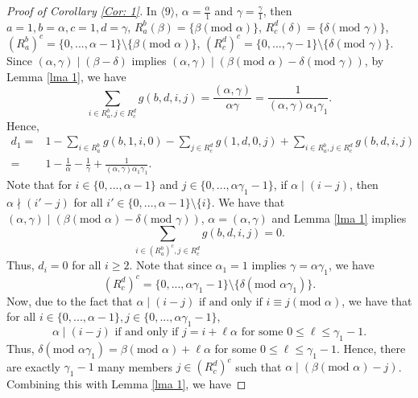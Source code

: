 \documentclass{amsart}
\theoremstyle{definition}
\numberwithin{equation}{section}%
\begin{document}
\begin{proof}[Proof of Corollary \ref{Cor: 1}]
    In $\langle 9 \rangle$, $\alpha=\frac{\alpha}{1}$ and $\gamma=\frac{\gamma}{1}$, then $a=1, b=\alpha, c=1, d=\gamma$, $R_a^b(\beta)=\{ \beta (\mbox{mod } \alpha) \}$, $R_c^d(\delta)=\{ \delta (\mbox{mod } \gamma) \}$, $(R_a^b)^c=\{0, ..., \alpha-1\}\setminus\{ \beta (\mbox{mod } \alpha) \}$, $(R_c^d)^c=\{0, ..., \gamma-1\}\setminus\{ \delta (\mbox{mod } \gamma) \}$. Since $(\alpha,\gamma)\mid (\beta-\delta)$ implies $(\alpha,\gamma)\mid (\beta(\mbox{mod }\alpha)- \delta(\mbox{mod }\gamma))$, by Lemma \ref{lma 1}, we have 
    \begin{equation*}
        \sum_{i\in R_a^b, j\in R_c^d}g(b,d,i,j)=\frac{(\alpha,\gamma)}{\alpha \gamma}=\frac{1}{(\alpha
,\gamma )\alpha _{1}\gamma _{1}}.
    \end{equation*}
    Hence, 
    \begin{align*}
             d_1=&1-\sum_{i\in R_a^b} g(b,1,i,0)-\sum_{j\in R_c^d} g(1,d,0,j)+\sum_{i\in R_a^b, j\in R_c^d}g(b,d,i,j)\\
        =& 1-\frac{1}{\alpha}-\frac{1}{\gamma}+\frac{1}{(\alpha
,\gamma )\alpha _{1}\gamma _{1}}.
    \end{align*}
Note that for $i\in \{0, ..., \alpha-1\}$ and $j\in \{0, ..., \alpha \gamma_1-1\}$, if $\alpha \mid (i-j)$, then $\alpha \nmid (i'-j)$ for all $i'\in \{0, ..., \alpha -1\}\setminus \{i\}$. We have that $(\alpha,\gamma)\mid (\beta(\mbox{mod }\alpha)- \delta(\mbox{mod }\gamma))$, $\alpha=(\alpha,\gamma)$ and Lemma \ref{lma 1} implies 
\begin{equation*}\label{pf 9-2}
    \sum_{i\in (R_a^b)^c, j\in R_c^d}g(b,d,i,j)=0.
\end{equation*}
Thus, $d_i=0$ for all $i\geq 2$. Note that since $\alpha_1=1$ implies $\gamma= \alpha \gamma_1$, we have
    \begin{equation*}
        (R_c^d)^c=\{0, ..., \alpha\gamma_1-1\}\setminus\{ \delta (\mbox{mod } \alpha\gamma_1) \}.
    \end{equation*}
Now, due to the fact that $\alpha\mid (i-j) \mbox{ if and only if } i\equiv j (\mbox{mod }\alpha)$, we have that for all $i \in \{0, ..., \alpha-1\}, j\in \{0, ..., \alpha \gamma_1-1\}$,
\begin{equation*}
    \alpha\mid (i-j) \mbox{ if and only if } j=i+\ell \alpha \mbox{ for some }0\leq \ell \leq \gamma_1-1.
\end{equation*}
Thus, $\delta (\mbox{mod } \alpha\gamma_1)=\beta(\mbox{mod }\alpha)+\ell \alpha $ for some $0\leq \ell \leq \gamma_1-1$. Hence, there are exactly $\gamma_1-1$ many members $j\in (R_c^d)^c$ such that $\alpha \mid (\beta(\mbox{mod }\alpha)-j)$. Combining this with Lemma \ref{lma 1}, we have

\end{proof}
\end{document}
